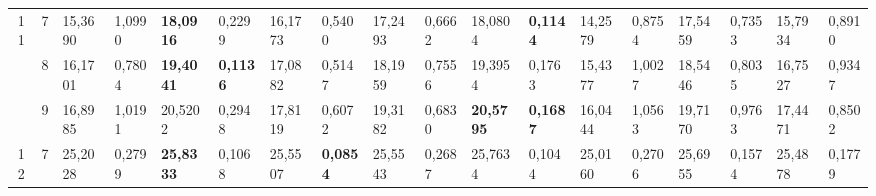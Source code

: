 \documentclass[conference]{IEEEtran}
\begin{document}
\begin{table*}[]
\begin{tabular}{|cc|ll|ll|ll|ll|ll|ll|ll|ll|}
		\multicolumn{1}{|c|}{\multirow{3}{*}{11}} & 7          & \multicolumn{1}{l|}{15,3690}           & 1,0990                            & \multicolumn{1}{l|}{\textbf{18,0916}}  & 0,2299                            & \multicolumn{1}{l|}{16,1773}           & 0,5400                            & \multicolumn{1}{l|}{17,2493}           & 0,6662                            & \multicolumn{1}{l|}{18,0804}           & \textbf{0,1144}                   & \multicolumn{1}{l|}{14,2579}           & 0,8754                            & \multicolumn{1}{l|}{17,5459}           & 0,7353                            & \multicolumn{1}{l|}{15,7934}           & 0,8910                            \\ \cline{2-18} 
		\multicolumn{1}{|c|}{}                    & 8          & \multicolumn{1}{l|}{16,1701}           & 0,7804                            & \multicolumn{1}{l|}{\textbf{19,4041}}  & \textbf{0,1136}                   & \multicolumn{1}{l|}{17,0882}           & 0,5147                            & \multicolumn{1}{l|}{18,1959}           & 0,7556                            & \multicolumn{1}{l|}{19,3954}           & 0,1763                            & \multicolumn{1}{l|}{15,4377}           & 1,0027                            & \multicolumn{1}{l|}{18,5446}           & 0,8035                            & \multicolumn{1}{l|}{16,7527}           & 0,9347                            \\ \cline{2-18} 
		\multicolumn{1}{|c|}{}                    & 9          & \multicolumn{1}{l|}{16,8985}           & 1,0191                            & \multicolumn{1}{l|}{20,5202}           & 0,2948                            & \multicolumn{1}{l|}{17,8119}           & 0,6072                            & \multicolumn{1}{l|}{19,3182}           & 0,6830                            & \multicolumn{1}{l|}{\textbf{20,5795}}  & \textbf{0,1687}                   & \multicolumn{1}{l|}{16,0444}           & 1,0563                            & \multicolumn{1}{l|}{19,7170}           & 0,9763                            & \multicolumn{1}{l|}{17,4471}           & 0,8502                            \\ \hline
		\multicolumn{1}{|c|}{\multirow{3}{*}{12}} & 7          & \multicolumn{1}{l|}{25,2028}           & 0,2799                            & \multicolumn{1}{l|}{\textbf{25,8333}}  & 0,1068                            & \multicolumn{1}{l|}{25,5507}           & \textbf{0,0854}                   & \multicolumn{1}{l|}{25,5543}           & 0,2687                            & \multicolumn{1}{l|}{25,7634}           & 0,1044                            & \multicolumn{1}{l|}{25,0160}           & 0,2706                            & \multicolumn{1}{l|}{25,6955}           & 0,1574                            & \multicolumn{1}{l|}{25,4878}           & 0,1779                            \\ \cline{2-18} 

\end{tabular}
\end{table*}
\end{document}
